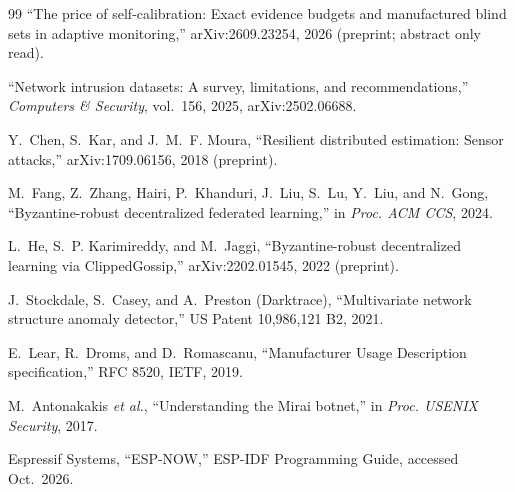 \begin{thebibliography}{99}
 ``The price of self-calibration: Exact evidence budgets and manufactured blind sets in
adaptive monitoring,'' arXiv:2609.23254, 2026 (preprint; abstract only read).

 ``Network intrusion datasets: A survey, limitations, and recommendations,''
\emph{Computers \& Security}, vol.~156, 2025, arXiv:2502.06688.

 Y.~Chen, S.~Kar, and J.~M.~F. Moura, ``Resilient distributed estimation: Sensor
attacks,'' arXiv:1709.06156, 2018 (preprint).

 M.~Fang, Z.~Zhang, Hairi, P.~Khanduri, J.~Liu, S.~Lu, Y.~Liu, and N.~Gong,
``Byzantine-robust decentralized federated learning,'' in \emph{Proc. ACM CCS}, 2024.

 L.~He, S.~P. Karimireddy, and M.~Jaggi, ``Byzantine-robust decentralized
learning via ClippedGossip,'' arXiv:2202.01545, 2022 (preprint).

 J.~Stockdale, S.~Casey, and A.~Preston (Darktrace), ``Multivariate network
structure anomaly detector,'' US Patent 10,986,121 B2, 2021.

 E.~Lear, R.~Droms, and D.~Romascanu, ``Manufacturer Usage Description specification,''
RFC 8520, IETF, 2019.

 M.~Antonakakis \emph{et al.}, ``Understanding the Mirai botnet,'' in \emph{Proc. USENIX
Security}, 2017.

 Espressif Systems, ``ESP-NOW,'' ESP-IDF Programming Guide, accessed Oct.~2026.

\end{thebibliography}
